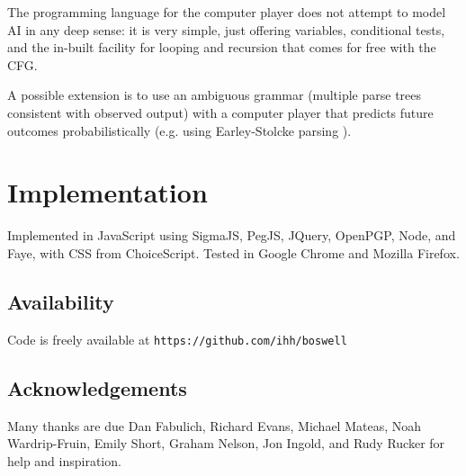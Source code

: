 \documentclass{acm_proc_article-sp}
\begin{document}
The programming language for the computer player does not attempt to model AI in any deep sense:
it is very simple, just offering variables, conditional tests, and the in-built facility for looping and recursion that comes for free with the CFG.

A possible extension is to use an ambiguous grammar (multiple parse trees consistent with observed output)
with a computer player that predicts future outcomes probabilistically
(e.g. using Earley-Stolcke parsing \cite{Stolcke:1995:EPC:211190.211197}).

\section{Implementation}

Implemented in JavaScript
using SigmaJS, PegJS, JQuery, OpenPGP, Node, and Faye,
with CSS from ChoiceScript.
Tested in Google Chrome and Mozilla Firefox.



\subsection{Availability}

Code is freely available at
{\tt https://github.com/ihh/boswell}


\subsection{Acknowledgements}

Many thanks are due Dan Fabulich, Richard Evans, Michael Mateas, Noah Wardrip-Fruin,
Emily Short, Graham Nelson, Jon Ingold,
and Rudy Rucker for help and inspiration.




\balancecolumns
\end{document}
